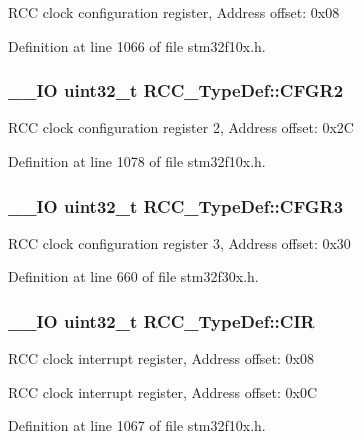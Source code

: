 R\-C\-C clock configuration register, Address offset\-: 0x08 

Definition at line 1066 of file stm32f10x.\-h.

\hypertarget{struct_r_c_c___type_def_af4b0f200c36cbfd1a449e2a85b372ef9}{
\subsubsection[{C\-F\-G\-R2}]{\setlength{\rightskip}{0pt plus 5cm}\-\_\-\-\_\-\-I\-O {\bf uint32\-\_\-t} R\-C\-C\-\_\-\-Type\-Def\-::\-C\-F\-G\-R2}}\label{struct_r_c_c___type_def_af4b0f200c36cbfd1a449e2a85b372ef9}
R\-C\-C clock configuration register 2, Address offset\-: 0x2\-C 

Definition at line 1078 of file stm32f10x.\-h.

\hypertarget{struct_r_c_c___type_def_aefff89d2cb0047b1fbd254a034404acf}{
\subsubsection[{C\-F\-G\-R3}]{\setlength{\rightskip}{0pt plus 5cm}\-\_\-\-\_\-\-I\-O {\bf uint32\-\_\-t} R\-C\-C\-\_\-\-Type\-Def\-::\-C\-F\-G\-R3}}\label{struct_r_c_c___type_def_aefff89d2cb0047b1fbd254a034404acf}
R\-C\-C clock configuration register 3, Address offset\-: 0x30 

Definition at line 660 of file stm32f30x.\-h.

\hypertarget{struct_r_c_c___type_def_aeadf3a69dd5795db4638f71938704ff0}{
\subsubsection[{C\-I\-R}]{\setlength{\rightskip}{0pt plus 5cm}\-\_\-\-\_\-\-I\-O {\bf uint32\-\_\-t} R\-C\-C\-\_\-\-Type\-Def\-::\-C\-I\-R}}\label{struct_r_c_c___type_def_aeadf3a69dd5795db4638f71938704ff0}
R\-C\-C clock interrupt register, Address offset\-: 0x08

R\-C\-C clock interrupt register, Address offset\-: 0x0\-C 

Definition at line 1067 of file stm32f10x.\-h.

